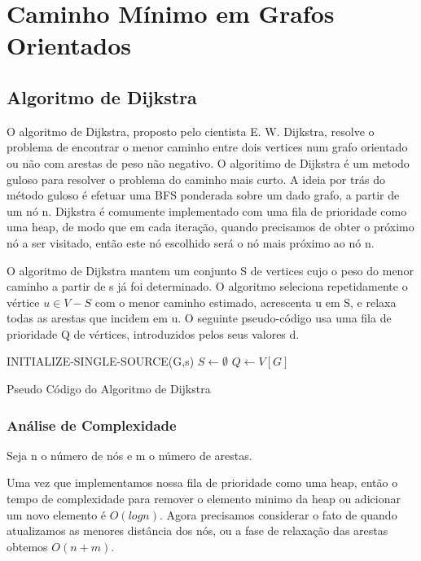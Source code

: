 \documentclass[a4paper,12pt]{article}
\begin{document}

\section{Caminho Mínimo em Grafos Orientados}

\subsection{Algoritmo de Dijkstra}
O algoritmo de Dijkstra, proposto pelo cientista E. W. Dijkstra, resolve o problema de encontrar o menor caminho entre dois vertices num grafo orientado ou não com arestas de peso não negativo.
O algoritimo de Dijkstra é um metodo guloso para resolver o problema do caminho mais curto.
A ideia por trás do método guloso é efetuar uma BFS ponderada sobre um dado grafo, a partir de um nó n. Dijkstra é comumente implementado com uma fila de prioridade como uma heap, de modo que em cada iteração, quando precisamos de obter o próximo nó a ser visitado, então este nó escolhido será o nó mais próximo ao nó n.

O algoritmo de Dijkstra mantem um conjunto S de vertices cujo o peso do menor caminho a partir de s já foi determinado. O algoritmo seleciona repetidamente o vértice $u \in V - S$ com o menor caminho estimado, acrescenta u em S, e relaxa todas as arestas que incidem em u. O seguinte pseudo-código usa uma fila de prioridade Q  de vértices, introduzidos pelos seus valores d.

\begin{algorithm}[H]
\LinesNumbered
\SetAlgoLined
{}
INITIALIZE-SINGLE-SOURCE(G,s)\;
$ S \gets \emptyset $\;
$ Q \gets V[G] $\;
\caption{Pseudo Código do Algoritmo de Dijkstra}
\end{algorithm}
\subsubsection{Análise de Complexidade}
Seja n o número de nós e m o número de arestas.

Uma vez que implementamos nossa fila de prioridade como uma heap, então o tempo de complexidade para remover o elemento minimo da heap ou adicionar um novo elemento é \emph{$O(log n)$}.
Agora precisamos considerar o fato de quando atualizamos as menores distância  dos nós, ou a fase de relaxação das arestas obtemos \emph{$O(n+m)$}.
\end{document}
